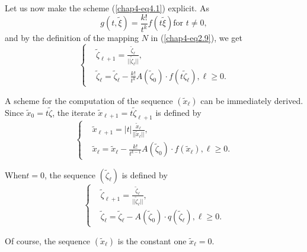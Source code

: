 Let us now make the scheme (\ref{chap4-eq4.1}) explicit. As
$$
g(t, \widetilde{\xi}) = \frac{k!}{t^{k}} f(t \widetilde{\xi}) \text{
  for } t \neq 0,
$$
and by the definition of the mapping $N$ in (\ref{chap4-eq2.9}), we get
\begin{equation*}
\begin{cases}
& \widetilde{\zeta}_{\ell + 1} =
  \frac{\widetilde{\zeta}_{\ell}}{||\widetilde{\zeta}_{\ell}||},\\
& \widetilde{\zeta}_{\ell} = \widetilde{\zeta}_{\ell} -
  \frac{k!}{t^{k}} A(\widetilde{\zeta}_{0}) \cdot f(t
  \widetilde{\zeta}_{\ell}), \ell \geq 0.
\end{cases}\tag{4.3}\label{chap4-eq4.3}
\end{equation*}

A scheme for the computation of the sequence $(\widetilde{x}_{\ell})$
can be immediately derived. Since $\widetilde{x}_{0} =
t\widetilde{\zeta}$, the iterate $\widetilde{x}_{\ell + 1} =
t\widetilde{\zeta}_{\ell + 1}$ is defined by 
\begin{equation*}
\begin{cases}
& \widetilde{x}_{\ell + 1} = |t|
  \frac{\widetilde{x}_{\ell}}{||\widetilde{x}_{\ell}||},\\
& \widetilde{x}_{\ell} = \widetilde{x}_{\ell} - \frac{k!}{t^{k-1}}
  A(\widetilde{\zeta}_{0}) \cdot f(\widetilde{x}_{\ell}), \ell \geq 0.
\end{cases}\tag{4.4}\label{chap4-eq4.4}
\end{equation*}

\begin{remark}\label{chap4-rem4.2}
When\pageoriginale $t = 0$, the sequence $(\widetilde{\zeta}_{\ell})$
is defined by
\begin{equation*}
\begin{cases}
& \widetilde{\zeta}_{\ell + 1} =
  \frac{\widetilde{\zeta}_{\ell}}{||\widetilde{\zeta}_{\ell}||},\\
& \widetilde{\zeta}_{\ell} = \widetilde{\zeta}_{\ell} -
  A(\widetilde{\zeta}_{0}) \cdot q(\widetilde{\zeta}_{\ell}), \ell
  \geq 0.
\end{cases}
\end{equation*}

Of course, the sequence $(\widetilde{x}_{\ell})$ is the constant one
$\widetilde{x}_{\ell} = 0$.
\end{remark}

